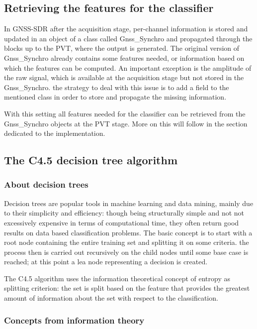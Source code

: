 \documentclass[a4paper]{usiinfbachelorproject}
\begin{document}
	\subsection{\textbf{Retrieving the features for the classifier}}
	
In GNSS-SDR after the acquisition stage, per-channel information is stored and updated in an object of a class called
Gnss\_Synchro and propagated through the blocks up to the PVT, where the output is generated. The original version
of Gnss\_Synchro already contains some features needed, or information based on which the features can be computed.
An important exception is the amplitude of the raw signal, which is available at the acquisition stage but not
stored in the Gnss\_Synchro. the strategy to deal with this issue is to add a field to the mentioned class
in order to store and propagate the missing information. 

With this setting all features needed for the classifier can be retrieved from the Gnss\_Synchro objects at the PVT stage. More on this will follow in the section dedicated to the implementation.


	\subsection{\textbf{The C4.5 decision tree algorithm}}
	
	\subsubsection{\textbf{About decision trees}}
	
Decision trees are popular tools in machine learning and data mining, mainly due to their
simplicity and efficiency: though being structurally simple and not not
excessively expensive in terms of computational time, they often return good results
on data based classification problems.
The basic concept is to start with a root node containing the entire training
set and splitting it on some criteria. the process then is carried out recursively
on the child nodes until some base case is reached; at this point a lea node representing
a decision is created.

The C4.5 algorithm uses the information theoretical concept of entropy as splitting criterion: the set is split based on the feature that provides the greatest amount of information about the set with respect to the classification.
	
	\subsubsection{\textbf{Concepts from information theory}}
	
\end{document}
